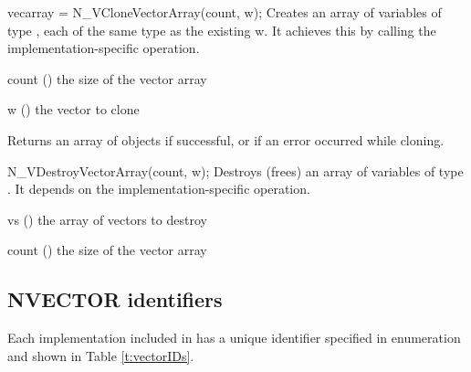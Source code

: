 {
  vecarray = N\_VCloneVectorArray(count, w);
}
{
  Creates an array of  variables of type ,
  each of the same type as the existing  w. It achieves
  this by calling the implementation-specific  operation.
}
{
  \begin{args}[count]
  \item[count] () the size of the vector array
  \item[w] () the vector to clone
  \end{args}
}
{
  Returns an array of   objects if successful, or
   if an error occurred while cloning.
}
{}

{
   N\_VDestroyVectorArray(count, w);
}
{
  Destroys (frees) an array of variables of type . It
  depends on the implementation-specific  operation.
}
{
  \begin{args}[count]
  \item[vs] () the array of vectors to destroy
  \item[count] () the size of the vector array
  \end{args}
}
{}
{}


\subsection{NVECTOR identifiers}
\label{ss:nvecIDs}

Each {\nvector} implementation included in {\sundials} has a
unique identifier specified in enumeration and shown in Table \ref{t:vectorIDs}.

